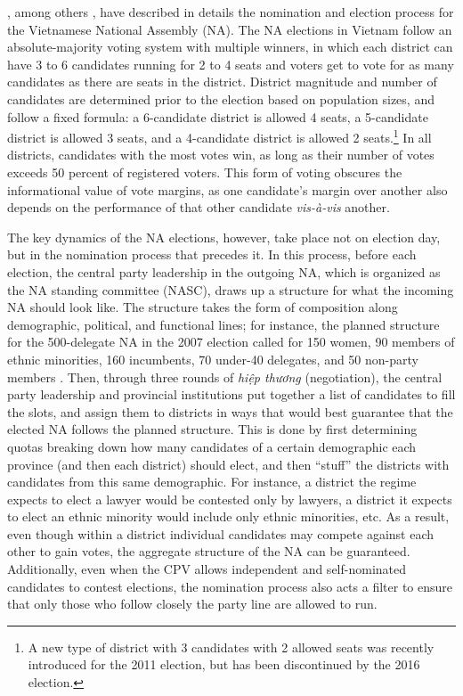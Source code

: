 \documentclass[12pt]{article}\usepackage[]{graphicx}\usepackage[]{color}
\newcommand{\1}{\mathbbm{1}}
\begin{document}
\cite{MaleskySchuler2011}, among others \citep[e.g][]{Gainsborough2005}, have described in details the nomination and election process for the Vietnamese National Assembly (NA). The NA elections in Vietnam follow an absolute-majority voting system with multiple winners, in which each district can have 3 to 6 candidates running for 2 to 4 seats and voters get to vote for as many candidates as there are seats in the district. District magnitude and number of candidates are determined prior to the election based on population sizes, and follow a fixed formula: a 6-candidate district is allowed 4 seats, a 5-candidate district is allowed 3 seats, and a 4-candidate district is allowed 2 seats.\footnote{A new type of district with 3 candidates with 2 allowed seats was recently introduced for the 2011 election, but has been discontinued by the 2016 election.} In all districts, candidates with the most votes win, as long as their number of votes exceeds 50 percent of registered voters. This form of voting obscures the informational value of vote margins, as one candidate's margin over another also depends on the performance of that other candidate \textit{vis-\`{a}-vis} another.

The key dynamics of the NA elections, however, take place not on election day, but in the nomination process that precedes it. In this process, before each election, the central party leadership in the outgoing NA, which is organized as the NA standing committee (NASC), draws up a structure for what the incoming NA should look like. The structure takes the form of composition along demographic, political, and functional lines; for instance, the planned structure for the 500-delegate NA in the 2007 election called for 150 women, 90 members of ethnic minorities, 160 incumbents, 70 under-40 delegates, and 50 non-party members  \citep[506]{MaleskySchuler2011}. Then, through three rounds of \textit{hiệp thương} (negotiation), the central party leadership and provincial institutions put together a list of candidates to fill the slots, and assign them to districts in ways that would best guarantee that the elected NA follows the planned structure. This is done by first determining quotas breaking down how many candidates of a certain demographic each province (and then each district) should elect, and then ``stuff'' the districts with candidates from this same demographic. For instance, a district the regime expects to elect a lawyer would be contested only by lawyers, a district it expects to elect an ethnic minority would include only ethnic minorities, etc. As a result, even though within a district individual candidates may compete against each other to gain votes, the aggregate structure of the NA can be guaranteed. Additionally, even when the CPV allows independent and self-nominated candidates to contest elections, the nomination process also acts a filter to ensure that only those who follow closely the party line are allowed to run.
\end{document}
